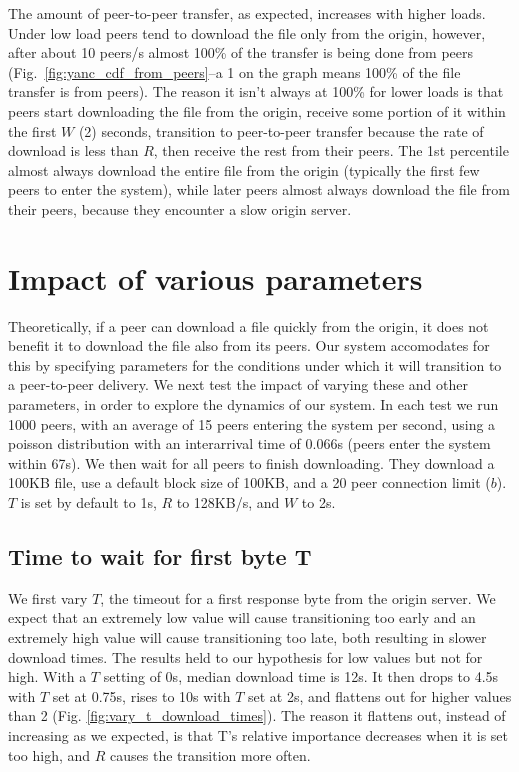 The amount of peer-to-peer transfer, as expected, increases with higher loads. Under low load peers tend to download 
the file only from the origin, however, after about 10 peers/s almost 100\% of the transfer is being 
done from peers (Fig.~\ref{fig:yanc_cdf_from_peers}--a 1 on the graph means 100\% of the file 
transfer is from peers). The reason it isn't always at 100\% for lower loads is that peers start 
downloading the file from the origin, receive some portion of it within the first $W$ (2) seconds, 
transition to peer-to-peer transfer because the rate of download is less than $R$, then receive the rest from their peers. 
The 1st percentile almost always download the entire file from the origin 
(typically the first few peers to enter the system), while later peers almost always download the 
file from their peers, because they encounter a slow origin server. 
\section{Impact of various parameters}

Theoretically, if a peer can download a file quickly from the origin, it does not benefit it to download the file also from its
peers. Our system accomodates for this by specifying parameters for the conditions under which it will 
transition to a peer-to-peer delivery. We next test the impact of varying these and other parameters, in order 
to explore the dynamics of our system. In each test we run 1000 peers, with an average of 15 peers entering 
the system per second, using a poisson distribution with an interarrival time of 0.066s (peers enter the system within 67s). 
We then wait for all peers to finish downloading. They download a 100KB file, use a default block size of 100KB, and a 20 peer
connection limit ($b$). $T$ is set by default to 1s, $R$ to 128KB/s, and $W$ to 2s. 

\subsection{Time to wait for first byte T}

We first vary $T$, the timeout for a first response byte from the origin server. We expect that an extremely low value 
will cause transitioning too early and an extremely high value 
will cause transitioning too late, both resulting in slower download times. The results held to our hypothesis for low values but not for 
high. With a $T$ setting of 0s, median download time is 12s. It then drops to 4.5s with $T$ set at 0.75s, 
rises to 10s with $T$ set at 2s, and flattens out for higher values than 2 (Fig. \ref{fig:vary_t_download_times}). 
The reason it flattens out, instead of increasing as we expected, is that T's relative importance decreases when it 
is set too high, and $R$ causes the transition more often.  


